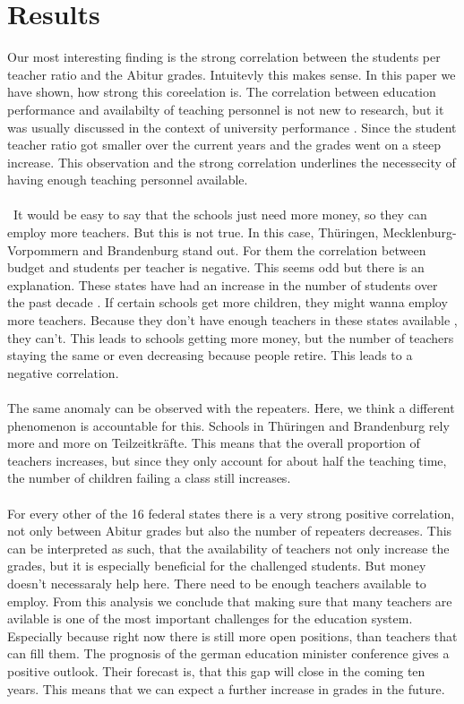 \section*{Results}
Our most interesting finding is the strong correlation between the students per teacher ratio and the Abitur grades. Intuitevly this makes sense. In this paper we have shown, how strong this coreelation is.  The correlation between education performance and availabilty of teaching personnel is not new to research, but it was usually discussed in the context of university performance \cite{doi:10.1080/00220485.1984.10845072}. Since the student teacher ratio got smaller over the current years and the grades went on a steep increase. This observation and the strong correlation underlines the necessecity of having enough teaching personnel available.\\\\\
It would be easy to say that the schools just need more money, so they can employ more teachers. But this is not true. In this case, Thüringen, Mecklenburg-Vorpommern and Brandenburg stand out. For them the correlation between budget and students per teacher is negative. This seems odd but there is an explanation. These states have had an increase in the number of students over the past decade \cite{Brandenburg}\cite{Sachsen} \cite{Mecklenburg}.  If certain schools get more children, they might wanna employ more teachers. Because they don't have enough teachers in these states available \cite{Kultusministerkonferenz}, they can't. This leads to schools getting more money, but the number of teachers staying the same or even decreasing because people retire. This leads to a negative correlation.\\\\
The same anomaly can be observed with the repeaters. Here, we think a different phenomenon is accountable for this. Schools in Thüringen and Brandenburg rely more and more on Teilzeitkräfte. This means that the overall proportion of teachers increases, but since they only account for  about half the teaching time, the number of children failing a class still increases.\\\\
For every other of the 16 federal states there is a very strong positive correlation, not only between Abitur grades but also the number of repeaters decreases. This can be interpreted as such, that the availability of teachers not only increase the grades, but it is especially beneficial for the challenged students. But money doesn't necessaraly help here. There need to be enough teachers available to employ. From this analysis we conclude that making sure that many teachers are avilable is one of the most important challenges for the education system. Especially because right now there is still more open positions, than teachers that can fill them. The prognosis of the german education minister conference \cite{Kultusministerkonferenz} gives a positive outlook. Their forecast is, that this gap will close in the coming ten years. This means that we can expect a further increase in grades in the future.\\\\
